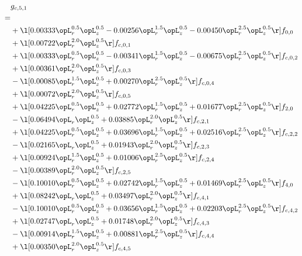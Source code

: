 \begin{alignat}{2} 
\label{eq:g_51_0} 
& g_{c,5,1} \nonumber \\ 
 = \\ 
& + \l[  0.00333 \opL_r^{0.5} \opL_z^{0.5}   -0.00256 \opL_r^{1.5} \opL_z^{0.5}   -0.00450 \opL_r^{2.5} \opL_z^{0.5}  \r] f_{0,0} \nonumber \\ 
& + \l[  0.00722 \opL_r^{2.0} \opL_z^{0.5}  \r] f_{c,0,1} \nonumber \\ 
& + \l[  0.00333 \opL_r^{0.5} \opL_z^{0.5}   -0.00341 \opL_r^{1.5} \opL_z^{0.5}   -0.00675 \opL_r^{2.5} \opL_z^{0.5}  \r] f_{c,0,2} \nonumber \\ 
& + \l[  0.00361 \opL_r^{2.0} \opL_z^{0.5}  \r] f_{c,0,3} \nonumber \\ 
& - \l[  0.00085 \opL_r^{1.5} \opL_z^{0.5} +  0.00270 \opL_r^{2.5} \opL_z^{0.5}  \r] f_{c,0,4} \nonumber \\ 
& + \l[  0.00072 \opL_r^{2.0} \opL_z^{0.5}  \r] f_{c,0,5} \nonumber \\ 
& + \l[  0.04225 \opL_r^{0.5} \opL_z^{0.5} +  0.02772 \opL_r^{1.5} \opL_z^{0.5} +  0.01677 \opL_r^{2.5} \opL_z^{0.5}  \r] f_{2,0} \nonumber \\ 
& - \l[  0.06494 \opL_r \opL_z^{0.5} +  0.03885 \opL_r^{2.0} \opL_z^{0.5}  \r] f_{c,2,1} \nonumber \\ 
& + \l[  0.04225 \opL_r^{0.5} \opL_z^{0.5} +  0.03696 \opL_r^{1.5} \opL_z^{0.5} +  0.02516 \opL_r^{2.5} \opL_z^{0.5}  \r] f_{c,2,2} \nonumber \\ 
& - \l[  0.02165 \opL_r \opL_z^{0.5} +  0.01943 \opL_r^{2.0} \opL_z^{0.5}  \r] f_{c,2,3} \nonumber \\ 
& + \l[  0.00924 \opL_r^{1.5} \opL_z^{0.5} +  0.01006 \opL_r^{2.5} \opL_z^{0.5}  \r] f_{c,2,4} \nonumber \\ 
& - \l[  0.00389 \opL_r^{2.0} \opL_z^{0.5}  \r] f_{c,2,5} \nonumber \\ 
& - \l[  0.10010 \opL_r^{0.5} \opL_z^{0.5} +  0.02742 \opL_r^{1.5} \opL_z^{0.5} +  0.01469 \opL_r^{2.5} \opL_z^{0.5}  \r] f_{4,0} \nonumber \\ 
& + \l[  0.08242 \opL_r \opL_z^{0.5} +  0.03497 \opL_r^{2.0} \opL_z^{0.5}  \r] f_{c,4,1} \nonumber \\ 
& - \l[  0.10010 \opL_r^{0.5} \opL_z^{0.5} +  0.03656 \opL_r^{1.5} \opL_z^{0.5} +  0.02203 \opL_r^{2.5} \opL_z^{0.5}  \r] f_{c,4,2} \nonumber \\ 
& + \l[  0.02747 \opL_r \opL_z^{0.5} +  0.01748 \opL_r^{2.0} \opL_z^{0.5}  \r] f_{c,4,3} \nonumber \\ 
& - \l[  0.00914 \opL_r^{1.5} \opL_z^{0.5} +  0.00881 \opL_r^{2.5} \opL_z^{0.5}  \r] f_{c,4,4} \nonumber \\ 
& + \l[  0.00350 \opL_r^{2.0} \opL_z^{0.5}  \r] f_{c,4,5} \nonumber \\ 
\end{alignat} 


